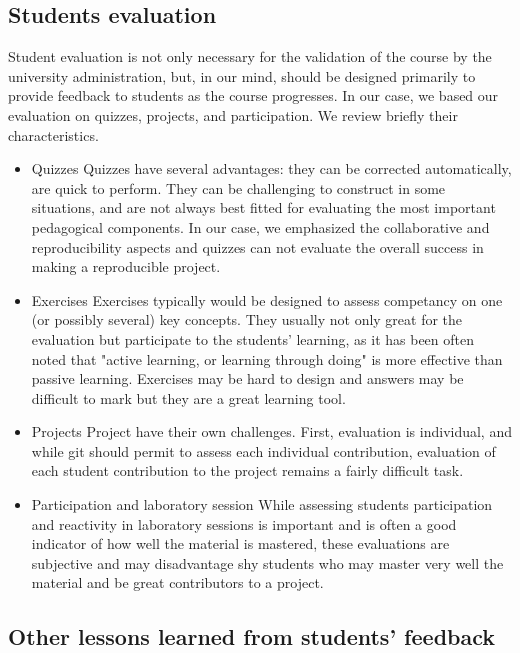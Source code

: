 \subsection*{Students evaluation}
Student evaluation is not only necessary for the validation of the course by the university administration, but, in our mind, should be designed primarily to provide feedback to students as the course progresses. In our case, we based our evaluation on quizzes, projects, and participation. We review briefly their characteristics.
\begin{itemize}
	\item Quizzes
Quizzes have several advantages: they can be corrected automatically, are quick to perform. They can be challenging to construct in some situations, and are not always best fitted for evaluating the most important pedagogical components. In our case, we emphasized the collaborative and reproducibility aspects and quizzes can not evaluate the overall success in making a reproducible project.
	\item Exercises 
Exercises typically would be designed to assess competancy on one (or possibly several) key concepts. They usually not only great for the evaluation but participate to the students' learning, as it has been often noted that "active learning, or learning through doing" is more effective than passive learning. Exercises may be hard to design and answers may be difficult to mark but they are a great learning tool. 
	\item Projects
Project have their own challenges. First, evaluation is individual, and while git should permit to assess each individual contribution, evaluation of each student contribution to the project remains a fairly difficult task. 
	\item Participation and laboratory session
While assessing students participation and reactivity in laboratory sessions is important and is often a good indicator of how well the material is mastered, these evaluations are subjective and may disadvantage shy students who may master very well the material and be great contributors to a project.  
\end{itemize}

\subsection*{Other lessons learned from students' feedback}

